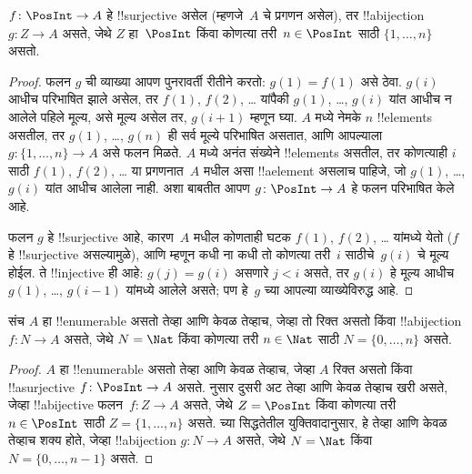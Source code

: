 \documentclass[../../../include/open-logic-section]{subfiles}
\begin{document}
\begin{prop}
$f\colon \PosInt \to A$ हे !!{surjective} असेल (म्हणजे~$A$
चे प्रगणन असेल), तर !!a{bijection} $g\colon Z \to A$ असते,
जेथे $Z$ हा~$\PosInt$ किंवा कोणत्या तरी~$n \in \PosInt$
साठी $\{1, \dots, n\}$ असतो.
\end{prop}

\begin{proof}
  फलन $g$ ची व्याख्या आपण पुनरावर्ती रीतीने करतो: $g(1) = f(1)$
  असे ठेवा. $g(i)$ आधीच परिभाषित झाले असेल, तर $f(1)$, $f(2)$,
  \dots{} यांपैकी $g(1)$, \dots, $g(i)$ यांत आधीच न आलेले
  पहिले मूल्य, असे मूल्य असेल तर, $g(i+1)$ म्हणून घ्या.
  $A$ मध्ये नेमके $n$ !!{element}s असतील, तर $g(1)$, \dots, $g(n)$
  ही सर्व मूल्ये परिभाषित असतात, आणि आपल्याला
  $g\colon \{1, \dots, n\} \to A$ असे फलन मिळते.
  $A$ मध्ये अनंत संख्येने !!{element}s असतील, तर कोणत्याही $i$
  साठी $f(1)$, $f(2)$, \dots{} या प्रगणनात~$A$ मधील असा
  !!a{element} असलाच पाहिजे, जो $g(1)$, \dots, $g(i)$ यांत
  आधीच आलेला नाही. अशा बाबतीत आपण $g\colon \PosInt \to A$
  हे फलन परिभाषित केले आहे.

  फलन $g$ हे !!{surjective} आहे, कारण~$A$ मधील कोणताही घटक
  $f(1)$, $f(2)$, \dots{} यांमध्ये येतो ($f$ हे !!{surjective}
  असल्यामुळे), आणि म्हणून कधी ना कधी तो कोणत्या तरी~$i$
  साठीचे~$g(i)$ चे मूल्य होईल. ते !!{injective} ही आहे:
  $g(j) = g(i)$ असणारे $j < i$ असते, तर $g(i)$ हे मूल्य
  आधीच $g(1)$, \dots, $g(i-1)$ यांमध्ये आलेले असते;
  पण हे~$g$ च्या आपल्या व्याख्येविरुद्ध आहे.
\end{proof}

\begin{cor}
संच $A$ हा !!{enumerable} असतो तेव्हा आणि केवळ तेव्हाच, जेव्हा
तो रिक्त असतो किंवा !!a{bijection} $f\colon N \to A$ असते,
जेथे $N = \Nat$ किंवा कोणत्या तरी $n \in \Nat$ साठी
$N = \{0, \dots, n\}$ असते.
\end{cor}

\begin{proof}
$A$ हा !!{enumerable} असतो तेव्हा आणि केवळ तेव्हाच, जेव्हा $A$
रिक्त असतो किंवा !!a{surjective} $f\colon \PosInt \to A$ असते.
 नुसार दुसरी अट तेव्हा आणि केवळ तेव्हाच
खरी असते, जेव्हा !!a{bijective} फलन~$f\colon Z \to A$ असते,
जेथे $Z = \PosInt$ किंवा कोणत्या तरी $n \in \PosInt$ साठी
$Z = \{1, \dots, n\}$ असते.  च्या
सिद्धतेतील युक्तिवादानुसार, हे तेव्हा आणि केवळ तेव्हाच शक्य होते,
जेव्हा !!a{bijection} $g\colon N \to A$ असते, जेथे
$N = \Nat$ किंवा $N = \{0, \dots, n-1\}$ असते.
\end{proof}
\end{document}
